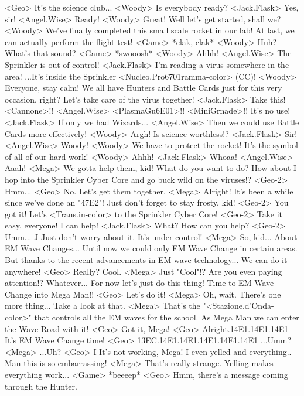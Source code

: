<Geo> It's the science club... 
<Woody> Is everybody ready? 
<Jack.Flask> Yes, sir! 
<Angel.Wise> Ready! 
<Woody> Great! Well let's get started, shall we? 
<Woody> We've finally completed this small scale rocket in our lab! 
At last, we can actually perform the flight test! 
<Game> *clak, clak* 
<Woody> Huh? What's that sound? 
<Game> *swooosh* 
<Woody> Ahhh! 
<Angel.Wise> The Sprinkler is out of control! 
<Jack.Flask> I'm reading a virus somewhere in the area! 
...It's inside the Sprinkler <Nucleo.Pro{67}{01}ramma-color> (CC)! 
<Woody> Everyone, stay calm! 
We all have Hunters and Battle Cards just for this very occasion, right? 
Let's take care of the virus together! 
<Jack.Flask> Take this! <Cannone>!! 
<Angel.Wise> <PlasmaGu{6E}{01}>!! <MiniGrnade>!! 
It's no use! 
<Jack.Flask> If only we had Wizards... 
<Angel.Wise> Then we could use Battle Cards more effectively! 
<Woody> Argh! Is science worthless!? 
<Jack.Flask> Sir! 
<Angel.Wise> Woody! 
<Woody> We have to protect the rocket! 
It's the symbol of all of our hard work! 
<Woody> Ahhh! 
<Jack.Flask> Whoaa! 
<Angel.Wise> Aaah! 
<Mega> We gotta help them, kid! 
What do you want to do? 
How about I hop into the Sprinkler Cyber Core and 
go buck wild on the viruses!? 
<Geo-2> Hmm... 
<Geo> No. Let's get them together. 
<Mega> Alright! It's been a while since we've done an "{47}{E2}"! 
Just don't forget to stay frosty, kid! 
<Geo-2> You got it! Let's <Trans.in-color> to the Sprinkler Cyber Core! 
<Geo-2> Take it easy, everyone! I can help! 
<Jack.Flask> What? How can you help? 
<Geo-2> Umm... J-Just don't worry about it. It's under control! 
<Mega> So, kid... About EM Wave Changes... 
Until now we could only EM Wave Change in certain areas. 
But thanks to the recent advancements in EM wave technology... 
We can do it anywhere! 
<Geo> Really? Cool. 
<Mega> Just "Cool"!? Are you even paying attention!? 
Whatever... For now let's just do this thing! 
Time to EM Wave Change into Mega Man!! 
<Geo> Let's do it! 
<Mega> Oh, wait. There's one more thing... 
Take a look at that. 
<Mega> That's the "<Stazione.d'Onda-color>" that controls all the EM waves for the school. 
As Mega Man we can enter the Wave Road with it! 
<Geo> Got it, Mega! 
<Geo> Alright.{14}{E1}.{14}{E1}.{14}{E1} 
It's EM Wave Change time! 
<Geo> {13}{EC}.{14}{E1}.{14}{E1}.{14}{E1}.{14}{E1}.{14}{E1} 
...Umm? 
<Mega> ...Uh? 
<Geo> I-It's not working, Mega! 
I even yelled and everything.. Man this is so embarrassing! 
<Mega> That's really strange. Yelling makes everything work... 
<Game> *beeeep* 
<Geo> Hmm, there's a message coming through the Hunter. 
